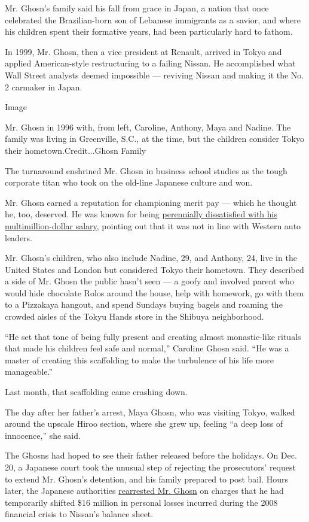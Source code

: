 Mr. Ghosn's family said his fall from grace in Japan, a nation that once
celebrated the Brazilian-born son of Lebanese immigrants as a savior,
and where his children spent their formative years, had been
particularly hard to fathom.

In 1999, Mr. Ghosn, then a vice president at Renault, arrived in Tokyo
and applied American-style restructuring to a failing Nissan. He
accomplished what Wall Street analysts deemed impossible --- reviving
Nissan and making it the No. 2 carmaker in Japan.

Image

Mr. Ghosn in 1996 with, from left, Caroline, Anthony, Maya and Nadine.
The family was living in Greenville, S.C., at the time, but the children
consider Tokyo their hometown.Credit...Ghosn Family

The turnaround enshrined Mr. Ghosn in business school studies as the
tough corporate titan who took on the old-line Japanese culture and won.

Mr. Ghosn earned a reputation for championing merit pay --- which he
thought he, too, deserved. He was known for being
\href{https://www.nytimes.com/2018/11/20/business/carlos-ghosn-arrested-nissan.html}{perennially
dissatisfied with his multimillion-dollar salary}, pointing out that it
was not in line with Western auto leaders.

Mr. Ghosn's children, who also include Nadine, 29, and Anthony, 24, live
in the United States and London but considered Tokyo their hometown.
They described a side of Mr. Ghosn the public hasn't seen --- a goofy
and involved parent who would hide chocolate Rolos around the house,
help with homework, go with them to a Pizzakaya hangout, and spend
Sundays buying bagels and roaming the crowded aisles of the Tokyu Hands
store in the Shibuya neighborhood.

``He set that tone of being fully present and creating almost
monastic-like rituals that made his children feel safe and normal,''
Caroline Ghosn said. ``He was a master of creating this scaffolding to
make the turbulence of his life more manageable.''

Last month, that scaffolding came crashing down.

The day after her father's arrest, Maya Ghosn, who was visiting Tokyo,
walked around the upscale Hiroo section, where she grew up, feeling ``a
deep loss of innocence,'' she said.

The Ghosns had hoped to see their father released before the holidays.
On Dec. 20, a Japanese court took the unusual step of rejecting the
prosecutors' request to extend Mr. Ghosn's detention, and his family
prepared to post bail. Hours later, the Japanese authorities
\href{http://fortune.com/2018/12/21/carlos-ghosn-re-arrested-japan/}{rearrested
Mr. Ghosn} on charges that he had temporarily shifted \$16 million in
personal losses incurred during the 2008 financial crisis to Nissan's
balance sheet.

